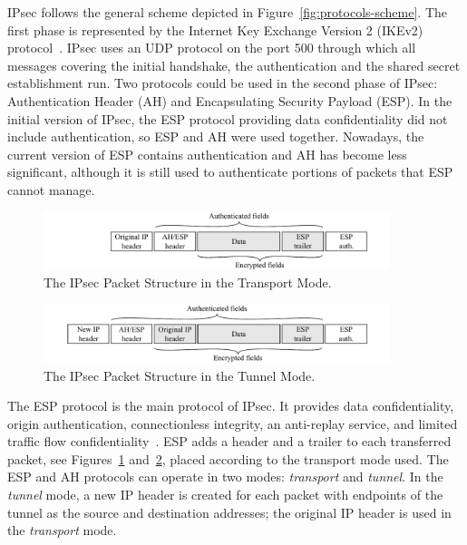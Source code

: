 IPsec follows the general scheme depicted in Figure~\ref{fig:protocols-scheme}. The first phase is represented by the Internet Key Exchange Version 2 (IKEv2) protocol~\cite{rfc5996}. IPsec uses an UDP protocol on the port 500 through which all messages covering the initial handshake, the authentication and the shared secret establishment run. Two protocols could be used in the second phase of IPsec: Authentication Header (AH) and Encapsulating Security Payload (ESP). In the initial version of IPsec, the ESP protocol providing data confidentiality did not include authentication, so ESP and AH were used together. Nowadays, the current version of ESP contains authentication and AH has become less significant, although it is still used to authenticate portions of packets that ESP cannot manage.



\begin{figure}[!ht]
  \centering
  \includegraphics[width=0.9\textwidth]{figures/ipsec_transport_mode}
  \caption{The IPsec Packet Structure in the Transport Mode.}
  \label{fig:ipsec-transport-mode}
\end{figure}

\begin{figure}[!ht]
  \centering
  \includegraphics[width=0.9\textwidth]{figures/ipsec_tunnel_mode}
  \caption{The IPsec Packet Structure in the Tunnel Mode.}
  \label{fig:ipsec-tunnel-mode}
\end{figure}

The ESP protocol is the main protocol of IPsec. It provides data confidentiality, origin authentication, connectionless integrity, an anti-replay service, and limited traffic flow confidentiality~\cite{rfc4303}. ESP adds a header and a trailer to each transferred packet, see Figures~\ref{fig:ipsec-transport-mode} and~\ref{fig:ipsec-tunnel-mode}, placed according to the transport mode used. The ESP and AH protocols can operate in two modes: \textit{transport} and \textit{tunnel}. In the \textit{tunnel} mode, a new IP header is created for each packet with endpoints of the tunnel as the source and destination addresses; the original IP header is used in the \textit{transport} mode.



